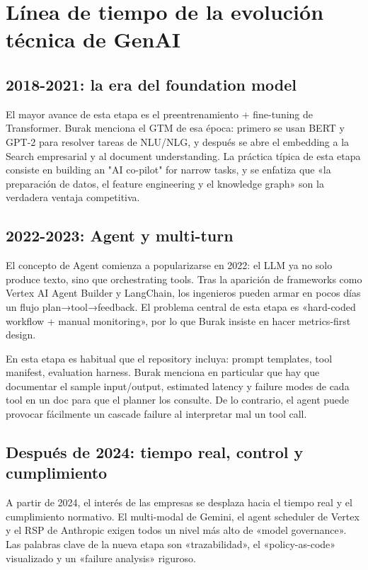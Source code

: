 \section{Línea de tiempo de la evolución técnica de GenAI}

\subsection{2018-2021: la era del foundation model}

El mayor avance de esta etapa es el preentrenamiento + fine-tuning de Transformer. Burak menciona el GTM de esa época: primero se usan BERT y GPT-2 para resolver tareas de NLU/NLG, y después se abre el embedding a la Search empresarial y al document understanding. La práctica típica de esta etapa consiste en building an "AI co-pilot" for narrow tasks, y se enfatiza que «la preparación de datos, el feature engineering y el knowledge graph» son la verdadera ventaja competitiva.

\subsection{2022-2023: Agent y multi-turn}
El concepto de Agent comienza a popularizarse en 2022: el LLM ya no solo produce texto, sino que orchestrating tools. Tras la aparición de frameworks como Vertex AI Agent Builder y LangChain, los ingenieros pueden armar en pocos días un flujo plan→tool→feedback. El problema central de esta etapa es «hard-coded workflow + manual monitoring», por lo que Burak insiste en hacer metrics-first design.

En esta etapa es habitual que el repository incluya: prompt templates, tool manifest, evaluation harness. Burak menciona en particular que hay que documentar el sample input/output, estimated latency y failure modes de cada tool en un doc para que el planner los consulte. De lo contrario, el agent puede provocar fácilmente un cascade failure al interpretar mal un tool call.

\subsection{Después de 2024: tiempo real, control y cumplimiento}

A partir de 2024, el interés de las empresas se desplaza hacia el tiempo real y el cumplimiento normativo. El multi-modal de Gemini, el agent scheduler de Vertex y el RSP de Anthropic exigen todos un nivel más alto de «model governance». Las palabras clave de la nueva etapa son «trazabilidad», el «policy-as-code» visualizado y un «failure analysis» riguroso.

